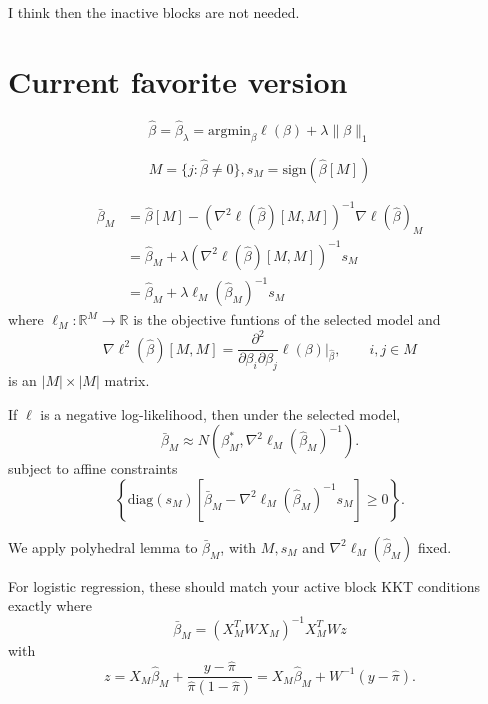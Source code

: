 \documentclass{article}
\begin{document}
I think then the inactive blocks are not needed.

\section{Current favorite version}

$$
\hat{\beta} = \hat{\beta}_{\lambda} = \text{argmin}_{\beta} \ell(\beta) + \lambda \|\beta\|_1
$$

$$
M = \{j: \hat{\beta} \neq 0\}, s_M = \text{sign}(\hat{\beta}[M])$$

$$
\begin{aligned}
\bar{\beta}_M &= \hat{\beta}[M] - \left(\nabla^2 \ell(\hat{\beta})[M,M]\right)^{-1} \nabla \ell(\hat{\beta})_M \\
&=  \hat{\beta}_M + \lambda \left(\nabla^2 \ell(\hat{\beta})[M,M]\right)^{-1} s_M \\
&=  \hat{\beta}_M + \lambda \ell_M(\hat{\beta}_M)^{-1} s_M
\end{aligned}
$$
where $\ell_M: \mathbb{R}^M \rightarrow \mathbb{R}$ is the objective funtions
of the selected model and
$$
\nabla \ell^2(\hat{\beta})[M,M] = \frac{\partial^2}{\partial \beta_i \partial \beta_j} \ell(\beta) \biggl|_{\hat{\beta}}, \qquad i,j \in M
$$
is an $|M| \times |M|$ matrix.

If $\ell$ is a negative log-likelihood, then under the selected model, 
$$
\bar{\beta}_M \approx N\left(\beta_M^*, \nabla^2 \ell_M(\hat{\beta}_M)^{-1}\right).
$$
subject to affine constraints
$$
\left\{\text{diag}(s_M)\left[\bar{\beta}_M - \nabla^2 \ell_M(\hat{\beta}_M)^{-1} s_M \right] \geq 0 \right\}.
$$

We apply polyhedral lemma to $\bar{\beta}_M$, with $M, s_M$ and $\nabla^2 \ell_M (\hat{\beta}_M)$ fixed.

For logistic regression, these should match your active block KKT conditions exactly where 
$$
\bar{\beta}_M = (X_M^TWX_M)^{-1}X_M^TWz
$$
with
$$
z = X_M\hat{\beta}_M + \frac{y - \hat{\pi}}{\hat{\pi}(1-\hat{\pi})}
= X_M\hat{\beta}_M + W^{-1}(y - \hat{\pi}).
$$
\end{document}
